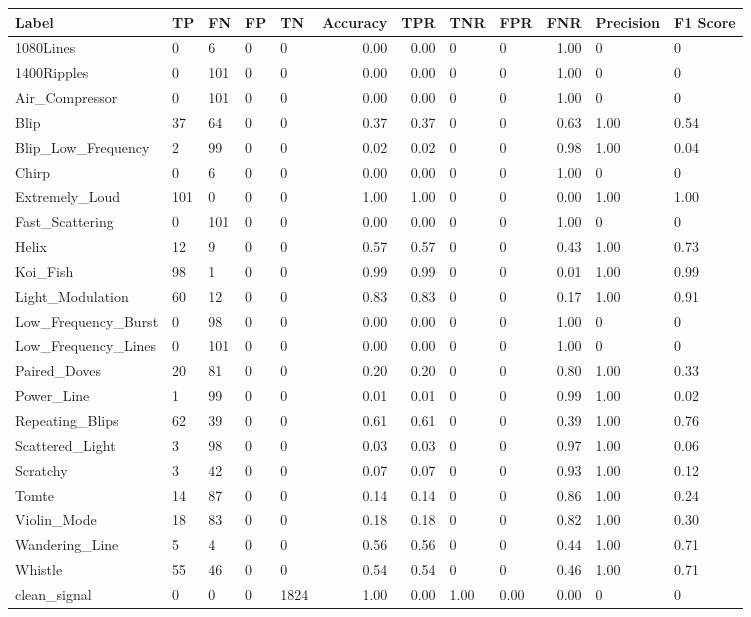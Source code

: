 \begin{tabular}{lllllrrllrll}
\toprule
Label & TP & FN & FP & TN & Accuracy & TPR & TNR & FPR & FNR & Precision & F1 Score \\
\midrule
1080Lines & 0 & 6 & 0 & 0 & 0.00 & 0.00 & 0 & 0 & 1.00 & 0 & 0 \\
1400Ripples & 0 & 101 & 0 & 0 & 0.00 & 0.00 & 0 & 0 & 1.00 & 0 & 0 \\
Air\_Compressor & 0 & 101 & 0 & 0 & 0.00 & 0.00 & 0 & 0 & 1.00 & 0 & 0 \\
Blip & 37 & 64 & 0 & 0 & 0.37 & 0.37 & 0 & 0 & 0.63 & 1.00 & 0.54 \\
Blip\_Low\_Frequency & 2 & 99 & 0 & 0 & 0.02 & 0.02 & 0 & 0 & 0.98 & 1.00 & 0.04 \\
Chirp & 0 & 6 & 0 & 0 & 0.00 & 0.00 & 0 & 0 & 1.00 & 0 & 0 \\
Extremely\_Loud & 101 & 0 & 0 & 0 & 1.00 & 1.00 & 0 & 0 & 0.00 & 1.00 & 1.00 \\
Fast\_Scattering & 0 & 101 & 0 & 0 & 0.00 & 0.00 & 0 & 0 & 1.00 & 0 & 0 \\
Helix & 12 & 9 & 0 & 0 & 0.57 & 0.57 & 0 & 0 & 0.43 & 1.00 & 0.73 \\
Koi\_Fish & 98 & 1 & 0 & 0 & 0.99 & 0.99 & 0 & 0 & 0.01 & 1.00 & 0.99 \\
Light\_Modulation & 60 & 12 & 0 & 0 & 0.83 & 0.83 & 0 & 0 & 0.17 & 1.00 & 0.91 \\
Low\_Frequency\_Burst & 0 & 98 & 0 & 0 & 0.00 & 0.00 & 0 & 0 & 1.00 & 0 & 0 \\
Low\_Frequency\_Lines & 0 & 101 & 0 & 0 & 0.00 & 0.00 & 0 & 0 & 1.00 & 0 & 0 \\
Paired\_Doves & 20 & 81 & 0 & 0 & 0.20 & 0.20 & 0 & 0 & 0.80 & 1.00 & 0.33 \\
Power\_Line & 1 & 99 & 0 & 0 & 0.01 & 0.01 & 0 & 0 & 0.99 & 1.00 & 0.02 \\
Repeating\_Blips & 62 & 39 & 0 & 0 & 0.61 & 0.61 & 0 & 0 & 0.39 & 1.00 & 0.76 \\
Scattered\_Light & 3 & 98 & 0 & 0 & 0.03 & 0.03 & 0 & 0 & 0.97 & 1.00 & 0.06 \\
Scratchy & 3 & 42 & 0 & 0 & 0.07 & 0.07 & 0 & 0 & 0.93 & 1.00 & 0.12 \\
Tomte & 14 & 87 & 0 & 0 & 0.14 & 0.14 & 0 & 0 & 0.86 & 1.00 & 0.24 \\
Violin\_Mode & 18 & 83 & 0 & 0 & 0.18 & 0.18 & 0 & 0 & 0.82 & 1.00 & 0.30 \\
Wandering\_Line & 5 & 4 & 0 & 0 & 0.56 & 0.56 & 0 & 0 & 0.44 & 1.00 & 0.71 \\
Whistle & 55 & 46 & 0 & 0 & 0.54 & 0.54 & 0 & 0 & 0.46 & 1.00 & 0.71 \\
clean\_signal & 0 & 0 & 0 & 1824 & 1.00 & 0.00 & 1.00 & 0.00 & 0.00 & 0 & 0 \\
\bottomrule
\end{tabular}
